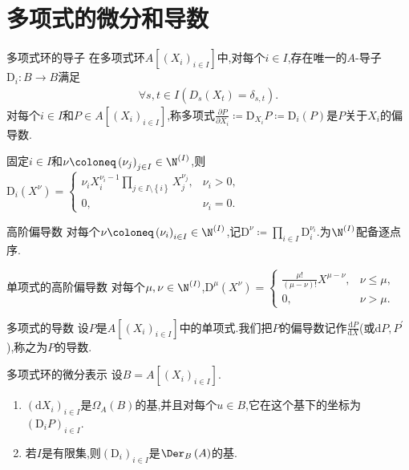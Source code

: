 \section{多项式的微分和导数}

\begin{definition}{多项式环的导子}{}
	在多项式环$A[(X_{i})_{i\in I}]$中,对每个$i\in I$,存在唯一的$A$-导子$\mathrm{D}_{i}:B\to B$满足
	\begin{align*}
		\forall s,t\in I\left(D_{s}\left(X_{t}\right)=\delta_{s,t}\right).
	\end{align*}
	对每个$i\in I$和$P\in A[(X_{i})_{i\in I}]$,称多项式$\frac{\partial P}{\partial X_{i}}\coloneq\mathrm{D}_{X_{i}}P\coloneq\mathrm{D}_{i}\left(P\right)$是$P$关于$X_{i}$的偏导数.
\end{definition}

\begin{remark}{}{}
	固定$i\in I$和$\nu\coloneq\left(\nu_{j}\right)_{j\in I}\in\N^{\left(I\right)}$,则$\mathrm{D}_{i}\left(X^{\nu}\right)=
	\begin{cases}
		\nu_{i}X_{i}^{\nu_{i}-1}\prod\limits_{j\in I\setminus\left\{i\right\}}X_{j}^{\nu_{j}},&\nu_{i}>0,\\
		0,&\nu_{i}=0.
	\end{cases}$
\end{remark}

\begin{definition}{高阶偏导数}{}
	对每个$\nu\coloneq\left(\nu_{i}\right)_{i\in I}\in\N^{\left(I\right)}$,记$\mathrm{D}^{\nu}\coloneq\prod\limits_{i\in I}\mathrm{D}_{i}^{\nu_{i}}$.为$\N^{\left(I\right)}$配备逐点序.
\end{definition}

\begin{proposition}{单项式的高阶偏导数}{}
	对每个$\mu,\nu\in\N^{\left(I\right)}$,$\mathrm{D}^{\mu}\left(X^{\nu}\right)=
	\begin{cases}
		\frac{\mu!}{\left(\mu-\nu\right)!}X^{\mu-\nu},&\nu\leq\mu,\\
		0,&\nu>\mu.
	\end{cases}$
\end{proposition}

\begin{definition}{多项式的导数}{}
	设$P$是$A[(X_{i})_{i\in I}]$中的单项式.我们把$P$的偏导数记作$\frac{\mathrm{d}P}{\mathrm{d}X}$(或$\mathrm{d}P,P^{\prime}$),称之为$P$的导数.
\end{definition}

\begin{definition}{多项式环的微分表示}{}
	设$B=A[(X_{i})_{i\in I}]$.
	\begin{enumerate}
		\item $\left(\mathrm{d}X_{i}\right)_{i\in I}$是$\Omega_{A}\left(B\right)$的基,并且对每个$u\in B$,它在这个基下的坐标为$\left(\mathrm{D}_{i}P\right)_{i\in I}$.
		\item 若$I$是有限集,则$\left(\mathrm{D}_{i}\right)_{i\in I}$是$\Der_{B}\left(A\right)$的基.
	\end{enumerate}
\end{definition}

